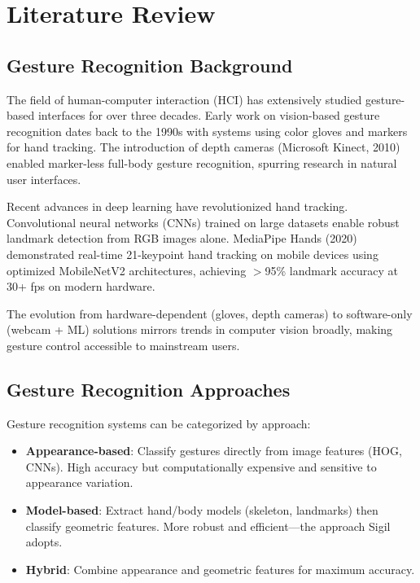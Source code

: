 \documentclass[11pt,a4paper]{article}
\begin{document}
\section{Literature Review}

\subsection{Gesture Recognition Background}

The field of human-computer interaction (HCI) has extensively studied gesture-based interfaces for over three decades. Early work on vision-based gesture recognition dates back to the 1990s with systems using color gloves and markers for hand tracking. The introduction of depth cameras (Microsoft Kinect, 2010) enabled marker-less full-body gesture recognition, spurring research in natural user interfaces.

Recent advances in deep learning have revolutionized hand tracking. Convolutional neural networks (CNNs) trained on large datasets enable robust landmark detection from RGB images alone. MediaPipe Hands (2020) demonstrated real-time 21-keypoint hand tracking on mobile devices using optimized MobileNetV2 architectures, achieving $>$95\% landmark accuracy at 30+ fps on modern hardware.

The evolution from hardware-dependent (gloves, depth cameras) to software-only (webcam + ML) solutions mirrors trends in computer vision broadly, making gesture control accessible to mainstream users.

\subsection{Gesture Recognition Approaches}

Gesture recognition systems can be categorized by approach:

\begin{itemize}
\item \textbf{Appearance-based}: Classify gestures directly from image features (HOG, CNNs). High accuracy but computationally expensive and sensitive to appearance variation.
\item \textbf{Model-based}: Extract hand/body models (skeleton, landmarks) then classify geometric features. More robust and efficient—the approach Sigil adopts.
\item \textbf{Hybrid}: Combine appearance and geometric features for maximum accuracy.
\end{itemize}
\end{document}
